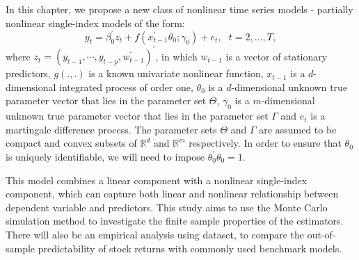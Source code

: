 \documentclass[a4paper,12pt,times,numbered,print,index]{report}
\numberwithin{equation}{section}
\begin{document}

In this chapter, we propose a new class of nonlinear time series models - partially nonlinear single-index models of the form:
\begin{equation}
	y_{t} = \beta_0^{\prime} z_t + f\left( x_{t-1}^{\prime }\theta_0; \gamma_0\right) +e_{t},\ \ \
	t=2,...,T,  
	\label{PL model}
\end{equation}%
where $z_t = (y_{t-1}, \cdots, y_{t-p}, w_{t-1}^{\prime})^{\prime}$, in which $w_{t-1}$ is a vector of stationary predictors, 
$g\left( .,.\right) $ is a known univariate nonlinear function, $x_{t-1}$ is a $d$-dimensional integrated process of order one, $\theta _{0}$ is a $d$-dimensional unknown true parameter vector that lies in the parameter set $\Theta $, $\gamma _{0}$ is a $m$-dimensional unknown true parameter vector that lies in the parameter set $\Gamma $ and $e_{t}$ is a martingale
difference process. The parameter sets $\Theta $ and $\Gamma $ are assumed to be compact and convex subsets of $\mathbb{R}^{d}$ and $\mathbb{R}^{m}$ respectively. In order to ensure that $\theta_0$ is uniquely identifiable, we will need to impose $\theta_{0}^{\prime}\theta_{0} = 1$. 

This model combines a linear component with a nonlinear single-index component, which can capture both linear and nonlinear relationship between dependent variable and predictors. This study aims to use the Monte Carlo simulation method to investigate the finite sample properties of the estimators. There will also be an empirical analysis using \cite{welch2008comprehensive} dataset, to compare the out-of-sample predictability of stock returns with commonly used benchmark models. 

\end{document}
